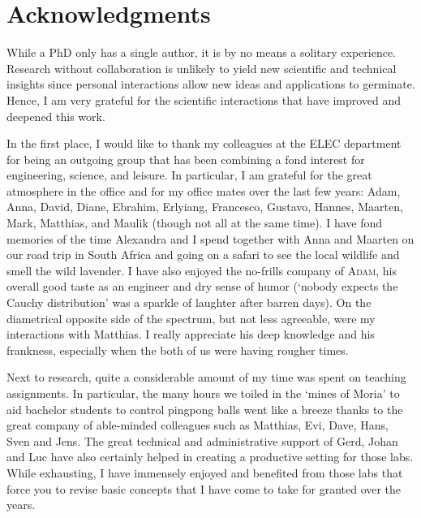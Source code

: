 \chapter*{Acknowledgments}

While a PhD only has a single author, it is by no means a solitary experience.
Research without collaboration is unlikely to yield new scientific and technical insights since personal interactions allow new ideas and applications to germinate.
Hence, I am very grateful for the scientific interactions that have improved and deepened this work.

In the first place, I would like to thank my colleagues at the ELEC department for being an outgoing group that has been combining a fond interest for engineering, science, and leisure.
In particular, I am grateful for the great atmosphere in the office and for my office mates over the last few years: Adam, Anna, David, Diane, Ebrahim, Erlyiang, Francesco, Gustavo, Hannes, Maarten, Mark, Matthias, and Maulik (though not all at the same time).
I have fond memories of the time Alexandra and I spend together with Anna and Maarten on our road trip in South Africa and going on a safari to see the local wildlife and smell the wild lavender.
I have also enjoyed the no-frills company of \textsc{Adam}, his overall good taste as an engineer and dry sense of humor (`nobody expects the Cauchy distribution' was a sparkle of laughter after barren days).
On the diametrical opposite side of the spectrum, but not less agreeable, were my interactions with Matthias.
I really appreciate his deep knowledge and his frankness, especially when the both of us were having rougher times.

Next to research, quite a considerable amount of my time was spent on teaching assignments.
In particular, the many hours we toiled in the `mines of Moria' to aid bachelor students to control pingpong balls went like a breeze thanks to the great company of able-minded colleagues such as Matthias, Evi, Dave, Hans, Sven and Jens.
The great technical and administrative support of Gerd, Johan and Luc have also certainly helped in creating a productive setting for those labs.
While exhausting, I have immensely enjoyed and benefited from those labs that force you to revise basic concepts that I have come to take for granted over the years.

